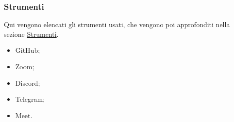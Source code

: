 \subsubsection{Strumenti}
Qui vengono elencati gli strumenti usati, che vengono poi approfonditi nella sezione \hyperref[sec:strumenti]{Strumenti}.

\begin{itemize}
    \item GitHub;
    \item Zoom;
    \item Discord;
    \item Telegram;
    \item Meet.
\end{itemize}
